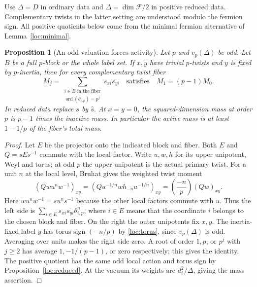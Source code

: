 \documentclass[11pt,a4paper]{article}
\numberwithin{equation}{section}
\newtheorem{proposition}[theorem]{Proposition}
\begin{document}
Use $\Delta=D$ in ordinary data and $\Delta=\dim\mathcal F/2$ in
positive reduced data. Complementary twists in the latter setting
are understood modulo the fermion sign. All positive quotients below
come from the minimal fermion alternative of Lemma~\ref{loc:minimal}.

\begin{proposition}[An odd valuation forces activity]\label{loc:odd-slices}
Let $p$ and $v_p(\Delta)$ be odd. Let $B$ be a full $p$-block or
the whole label set. If $x,y$ have trivial $p$-twists and $y$ is
fixed by $p$-inertia, then for every complementary twist fiber
\[
 M_j=\sum_{\substack{i\in B\text{ in the fiber}\\
                  \operatorname{ord}(\theta_{i,p})=p^j}}
                s_{xi}\overline{s_{yi}}
       \quad\text{satisfies}\quad M_1=(p-1)M_0.
\]
In reduced data replace $s$ by $\widehat s$. At $x=y=0$, the
squared-dimension mass at order $p$ is $p-1$ times the inactive
mass. In particular the active mass is at least $1-1/p$ of the
fiber's total mass.
\end{proposition}
\begin{proof}
Let $E$ be the projector onto the indicated block and fiber.
Both $E$ and $Q=sEs^{-1}$ commute with the local factor. Write
$u,w,h$ for its upper unipotent, Weyl and torus; at odd $p$ the
upper unipotent is the actual primary twist. For a unit $n$ at
the local level, Bruhat gives the weighted twist moment
\[
 (Qwu^nw^{-1})_{xy}
  =(Qu^{-1/n}wh_{-n}u^{-1/n})_{xy}
  =\left(\frac{-n}{p}\right)(Qw)_{xy}.
\]
Here $wu^nw^{-1}=su^ns^{-1}$ because the other local factors
commute with $u$. Thus the left side is
$\sum_{i\in E}s_{xi}\overline{s_{yi}}\theta_{i,p}^n$,
where $i\in E$ means that the coordinate $i$ belongs to the chosen
block and fiber. On the right the outer unipotents fix $x,y$. The inertia-fixed label $y$
has torus sign $({-n}/p)$ by \eqref{loc:torus}, since
$v_p(\Delta)$ is odd. Averaging over units makes the right side
zero. A root of order $1,p$, or $p^j$ with $j\ge2$ has average
$1,-1/(p-1)$, or zero respectively; this gives the identity.
The positive quotient has the same odd local action and torus
sign by Proposition~\ref{loc:reduced}. At the vacuum its weights
are $d_i^2/\Delta$, giving the mass assertion.
\end{proof}
\end{document}
